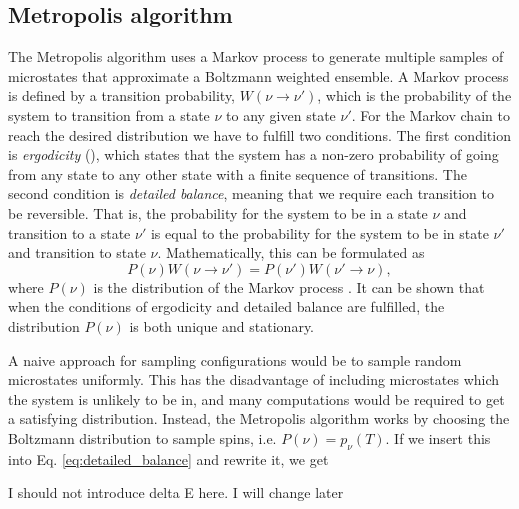 \subsection{Metropolis algorithm} \label{subsec_theory:metropolis_algorithm}
The Metropolis algorithm uses a Markov process to generate multiple samples of microstates that approximate a Boltzmann weighted ensemble. A Markov process is defined by a transition probability, $W(\nu \to \nu')$, which is the probability of the system to transition from a state $\nu$ to any given state $\nu'$. For the Markov chain to reach the desired distribution we have to fulfill two conditions.  The first condition is \textit{ergodicity} (), which states that the system has a non-zero probability of going from any state to any other state with a finite sequence of transitions. The second condition is \textit{detailed balance}, meaning that we require each transition to be reversible. That is, the probability for the system to be in a state $\nu$ and transition to a state $\nu'$ is equal to the probability for the system to be in state $\nu'$ and transition to state $\nu$. Mathematically, this can be formulated as 
\begin{equation}
    P(\nu)W(\nu\to \nu') = P(\nu') W(\nu'\to \nu), \label{eq:detailed_balance}
\end{equation} 
where $P(\nu)$ is the distribution of the Markov process . It can be shown that when the conditions of ergodicity and detailed balance are fulfilled, the distribution $P(\nu)$ is both unique and stationary. 

A naive approach for sampling configurations would be to sample random microstates uniformly. This has the disadvantage of including microstates which the system is unlikely to be in, and many computations would be required to get a satisfying distribution. Instead, the Metropolis algorithm works by choosing the Boltzmann distribution to sample spins, i.e. $P(\nu)=p_\nu(T)$. If we insert this into Eq. \eqref{eq:detailed_balance} and rewrite it, we get 

\alert{I should not introduce delta E here. I will change later}

